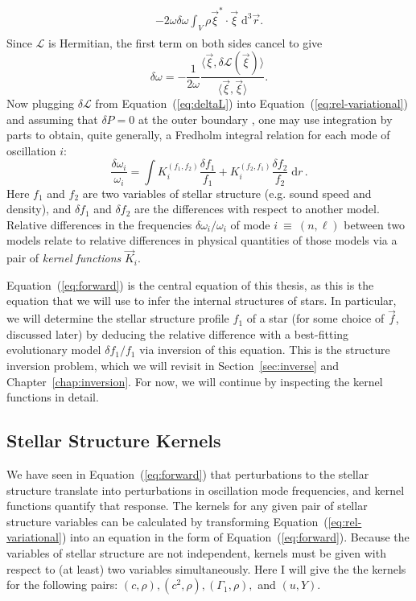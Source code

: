 {\begin{align}
\begin{split}
    -2\omega\delta\omega\int_V \rho \vec\xi^\ast \cdot  \vec\xi \; \text{d}^3\vec r.
\end{split}
\end{align}
Since $\mathcal{L}$ is Hermitian, the first term on both sides cancel to give
\begin{equation} \label{eq:rel-variational}
    \delta\omega
    =
    -\frac{1}{2\omega}\frac{\langle \vec\xi, \delta \mathcal{L}(\vec\xi) \rangle}{\langle \vec\xi, \vec\xi \rangle}.
\end{equation}
Now plugging $\delta\mathcal{L}$ from Equation~(\ref{eq:deltaL}) into Equation~(\ref{eq:rel-variational}) and assuming that $\delta P=0$ at the outer boundary \citep[e.g.,][]{1967MNRAS.136..293L}, one may use integration by parts to obtain, quite generally, a Fredholm integral relation for each mode of oscillation $i$:
\begin{equation} \label{eq:forward} \boxed{
  \frac{\delta\omega_i}{\omega_i} 
  = 
  \int K_i^{(f_1, f_2)} \frac{\delta f_1}{f_1}
                + K_i^{(f_2, f_1)} \frac{\delta f_2}{f_2}
       \;\text{d}r
}\,. \end{equation}}
Here $f_1$ and $f_2$ are two variables of stellar structure (e.g. sound speed and density), and
${\delta f_1}$ and ${\delta f_2}$ are the differences with respect to another model. %
Relative differences in the frequencies ${\delta\omega_i/\omega_i}$ of mode ${i~\equiv~(n,\ell)}$ between two models relate to relative differences in physical quantities of those models via a pair of \emph{kernel functions} $\vec{K}_i$. 

Equation~(\ref{eq:forward}) is the central equation of this thesis, as this is the equation that we will use to infer the internal structures of stars. 
In particular, we will determine the stellar structure profile $f_1$ of a star (for some choice of $\vec{f}$, discussed later) by deducing the relative difference with a best-fitting evolutionary model ${\delta f_1/f_1}$ via inversion of this equation. 
This is the structure inversion problem, which we will revisit in Section~\ref{sec:inverse} and Chapter~\ref{chap:inversion}. 
For now, we will continue by inspecting the kernel functions in detail. 


\subsection{Stellar Structure Kernels}
\label{sec:kernels}
We have seen in Equation~(\ref{eq:forward}) that perturbations to the stellar structure translate into perturbations in oscillation mode frequencies, and kernel functions quantify that response. 
The kernels for any given pair of stellar structure variables can be calculated by transforming Equation~(\ref{eq:rel-variational}) into an equation in the form of Equation~(\ref{eq:forward}). 
Because the variables of stellar structure are not independent, kernels must be given with respect to (at least) two variables simultaneously. 
Here I will give the the kernels for the following pairs: ${(c,\rho)}, {(c^2,\rho)}, {(\Gamma_1,\rho)},$ and ${(u,Y)}$. 

